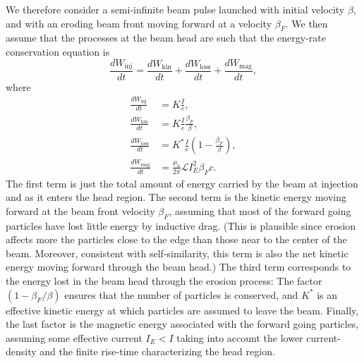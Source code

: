 \documentclass [12pt,a4paper,     ]{report} %
\begin{document}
   We therefore consider a semi-infinite beam pulse launched with initial velocity $\beta$, and with an eroding beam front moving forward at a velocity $\beta_F$.  We then assume that the processes at the beam head are such that the energy-rate conservation equation is
%
\begin{equation}\label{ind:6} %
        \frac{d W_{\text{inj}}}{d t}
     =  \frac{d W_{\text{kin}}}{d t}
     +  \frac{d W_{\text{loss}}}{d t}
     +  \frac{d W_{\text{mag}}}{d t},
\end{equation}
%
where
%
\begin{align}\label{ind:7} %
       \frac{d W_{\text{inj}}}{d t} & =  K \frac{I}{e},   \\
       \frac{d W_{\text{kin}}}{d t} & =  K \frac{I}{e}
                                              \frac{\beta_F}{\beta},  \\
       \frac{d W_{\text{loss}}}{d t}& =  K^*\frac{I}{e}
                                               (1-\frac{\beta_F}{\beta}), \\
       \frac{d W_{\text{mag}}}{d t} & =  \frac{\mu_0}{2\pi}
                                            \mathcal{L} I_E^2 \beta_F c  .
\end{align}
%
The first term is just the total amount of energy carried by the beam at injection and as it enters the head region. The second term is the kinetic energy moving forward at the beam front velocity $\beta_F$, assuming that most of the forward going particles have lost little energy by inductive drag.  (This is plausible since erosion affects more the particles close to the edge than those near to the center of the beam.  Moreover, consistent with self-similarity, this term is also the net kinetic energy moving forward through the beam head.)  The third term corresponds to the energy lost in the beam head through the erosion process:  The factor $(1-\beta_F/\beta)$ ensures that the number of particles is conserved, and $K^*$ is an effective kinetic energy at which particles are assumed to leave the beam. Finally, the last factor is the magnetic energy associated with the forward going particles, assuming some effective current $I_E < I$ taking into account the lower current-density and the finite rise-time characterizing the head region.
\end{document}
